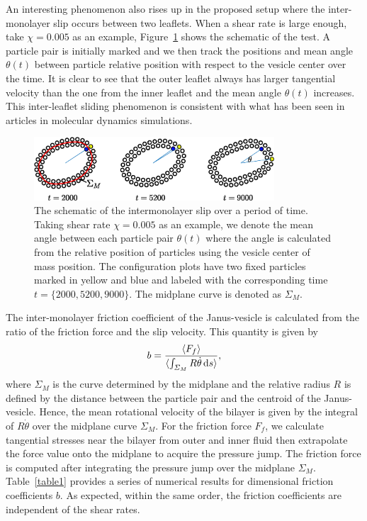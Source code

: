 \documentclass[lineno]{jfm}
\begin{document}
An interesting phenomenon also rises up in the proposed setup where the inter-monolayer slip occurs 
between two leaflets. When a shear rate is large enough, take $\chi = 0.005$ as an example, 
Figure~\ref{figure5} shows the schematic of the test. A particle pair is initially marked and we then track the positions and mean angle $\theta(t)$ between particle relative position with respect to the vesicle center over the time. It is clear to see that the outer leaflet always has larger 
tangential velocity than the one from the inner leaflet and the mean angle $\theta(t)$ increases. 
This inter-leaflet sliding phenomenon is consistent with what has been seen
in articles in molecular dynamics simulations.

%


\begin{figure}
\begin{center}
\includegraphics[width=0.8\textwidth]{Slip.eps}
\end{center} 
  \caption{The schematic of the intermonolayer slip over a period of time. Taking shear rate $\chi=0.005$ as an example, we denote the mean angle between each particle pair $\theta(t)$ where the angle is calculated from the relative position of particles using the vesicle center of mass position. The configuration plots have two fixed particles marked in yellow and blue and labeled with the corresponding time $t=\{2000,5200,9000\}$. The midplane curve is denoted as $\Sigma_M$.
  }
    \label{figure5}
\end{figure}




The inter-monolayer friction coefficient of the Janus-vesicle is calculated from the ratio of the friction force and the slip velocity. This quantity is given by 
\begin{equation}
b = \frac{\langle F_f\rangle}{\langle\int_{\Sigma_M} R \dot\theta \dif s\rangle},
\end{equation}
%
where $\Sigma_M$ is the curve determined by the midplane and the relative radius $R$ is defined by the distance between the particle pair and the centroid of the Janus-vesicle. Hence, the mean rotational velocity 
of the bilayer is given by the integral of $R\dot\theta$ over the midplane curve $\Sigma_M$.
For the friction force $F_f$, we calculate tangential stresses near the bilayer from outer and inner fluid then 
extrapolate the force value onto the midplane to acquire the pressure jump. The friction force is computed after integrating the pressure jump over the midplane $\Sigma_M$.
Table~\ref{table1} provides a series of numerical results for dimensional friction coefficients $b$. As expected,
within the same order, the friction coefficients are independent of the shear rates.
\end{document}
